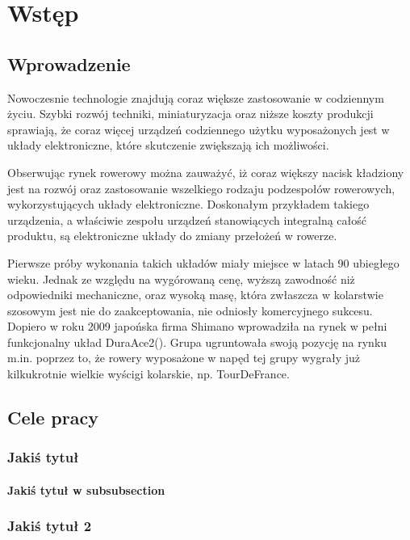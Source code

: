 \chapter{Wstęp}
\label{cha:Wstęp}

\section{Wprowadzenie}
\label{sec:Wprowadzenie}
Nowoczesnie technologie znajdują coraz większe zastosowanie w codziennym życiu. Szybki rozwój techniki, miniaturyzacja oraz niższe koszty produkcji sprawiają, że coraz więcej urządzeń codziennego użytku wyposażonych jest w układy elektroniczne, które skutczenie zwiększają ich możliwości. 

Obserwując rynek rowerowy można zauważyć, iż coraz większy nacisk kładziony jest na rozwój oraz zastosowanie wszelkiego rodzaju podzespołów rowerowych, wykorzystujących układy elektroniczne. Doskonałym przykładem takiego urządzenia, a właściwie zespołu urządzeń stanowiących integralną całość produktu, są elektroniczne układy do zmiany przełożeń w rowerze.

Pierwsze próby wykonania takich układów miały miejsce w latach 90 ubiegłego wieku. Jednak ze względu na wygórowaną cenę, wyższą zawodność niż odpowiedniki mechaniczne, oraz wysoką masę, która zwłaszcza w kolarstwie szosowym jest nie do zaakceptowania, nie odniosły komercyjnego sukcesu. Dopiero w roku 2009 japońska firma Shimano wprowadziła na rynek w pełni funkcjonalny układ DuraAce2(\cite{shimanoHistory}). Grupa ugruntowała swoją pozycję na rynku m.in. poprzez to, że rowery wyposażone w napęd tej grupy wygrały już kilkukrotnie wielkie wyścigi kolarskie, np. TourDeFrance.

\section{Cele pracy}
\label{sec:celePracy}

\subsection{Jakiś tytuł}
\subsubsection{Jakiś tytuł w subsubsection}
\subsection{Jakiś tytuł 2}